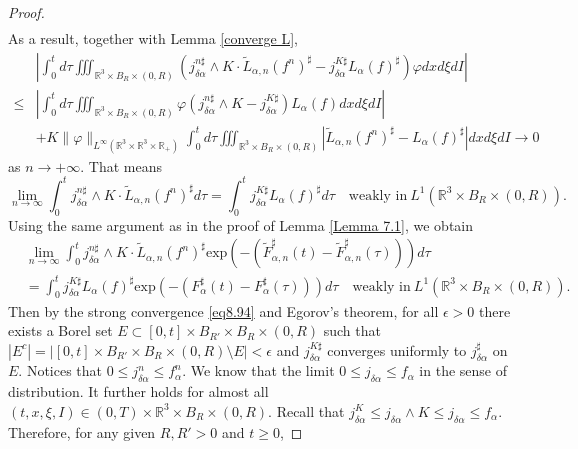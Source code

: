 \documentclass[reqno,11pt]{amsart}
\numberwithin{equation}{section}
\def\R{\mathbb{R}}
\def\exp{\mathrm{exp}}
\begin{document}
\begin{proof}
\begin{equation*}
\begin{aligned}
	\end{aligned}
\end{equation*}
As a result, together with Lemma \ref{converge L},
\begin{equation*}
	\begin{aligned}
		&|\int_{0}^{t} d \tau \iiint_{ \R^3 \times B_R \times (0,R)}  (j^{n\sharp}_{\delta \alpha }\wedge K \cdot \tilde{L}_{\alpha ,n}(f^n)^\sharp - j^{K\sharp}_{\delta \alpha } L_\alpha(f)^\sharp) \varphi dxd\xi dI| \\
		\leq &| \int_{0}^{t} d \tau \iiint_{ \R^3 \times B_R \times (0,R)} \varphi (j^{n\sharp}_{\delta \alpha }\wedge K -j^{K\sharp}_{\delta \alpha } ) L_{\alpha}(f) dxd\xi dI | \\
& + K \| \varphi \|_{ L^\infty ( \R^3 \times \R^3 \times \R_+ ) } \int_{0}^{t}d \tau \iiint_{ \R^3 \times B_R \times (0,R)} |\tilde{L}_{\alpha ,n}(f^n)^\sharp-L_\alpha(f)^\sharp|dxd\xi dI \rightarrow 0 
	\end{aligned}
\end{equation*}
as $n\rightarrow +\infty$. That means
\begin{equation*}
	\lim \limits_{n\rightarrow \infty} \int_{0}^{t} j^{n\sharp}_{\delta \alpha }\wedge K \cdot \tilde{L}_{\alpha ,n}(f^n)^\sharp d \tau = \int_{0}^{t} j^{K\sharp}_{\delta \alpha } L_\alpha(f)^\sharp d \tau \quad \text{weakly in}\ L^1( \R^3 \times B_R\times (0,R)).
\end{equation*}
Using the same argument as in the proof of Lemma \ref{Lemma 7.1}, we obtain 
\begin{equation}\label{eq8.99}
	\begin{aligned}
		& \lim \limits_{n\rightarrow \infty} \int_{0}^{t} j^{n\sharp}_{\delta \alpha }\wedge K \cdot \tilde{L}_{\alpha ,n}(f^n)^\sharp \exp(-(\tilde{F}^\sharp _{\alpha ,n } (t)- \tilde{F}^\sharp _{\alpha ,n } (\tau))) d \tau \\
		&=\int_{0}^{t}  j^{K\sharp}_{\delta \alpha } L_\alpha(f)^\sharp \exp(-(F^\sharp _{\alpha } (t)- F^\sharp _{\alpha } (\tau)))d \tau \quad \text{weakly in}\ L^1( \R^3 \times B_R\times (0,R)).
	\end{aligned}
\end{equation}
Then by the strong convergence \eqref{eq8.94} and Egorov's theorem, for all $\epsilon>0 $ there exists a Borel set $E\subset [0,t]\times B_{R'} \times B_R \times (0, R)$ such that $|E^c| = | [0,t]\times B_{R'} \times B_R \times (0, R) \setminus E |<\epsilon$ and $j^{K\sharp}_{\delta \alpha }$ converges uniformly to $j^{\sharp}_{\delta \alpha }$ on $E$. Notices that $0\leq j^n_{\delta \alpha} \leq f^n_\alpha$. We know that the limit $0\leq j_{\delta \alpha } \leq f_\alpha$ in the sense of distribution. It further holds for almost all $(t, x, \xi, I) \in (0, T) \times \R^3 \times B_R \times (0, R)$. Recall that $j_{\delta \alpha }^K \leq j_{\delta \alpha } \wedge K \leq j_{\delta \alpha } \leq f_\alpha$. Therefore, for any given $R, R'>0$ and $t \geq 0$,

\end{proof}
\end{document}
